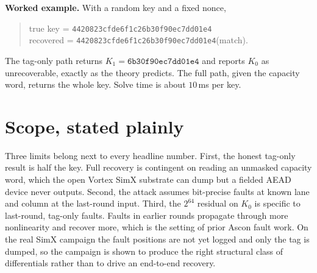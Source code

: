 \documentclass[11pt]{article}
\begin{document}
\noindent\textbf{Worked example.} With a random key and a fixed nonce,
\begin{quote}
true key \;=\; \texttt{4420823cfde6f1c26b30f90ec7dd01e4}\\
recovered \;=\; \texttt{4420823cfde6f1c26b30f90ec7dd01e4}\quad(match).
\end{quote}
The tag-only path returns $K_1 = \texttt{6b30f90ec7dd01e4}$ and reports $K_0$ as
unrecoverable, exactly as the theory predicts. The full path, given the capacity
word, returns the whole key. Solve time is about $10$\,ms per key.

\section{Scope, stated plainly}
Three limits belong next to every headline number.
First, the honest tag-only result is half the key. Full recovery is contingent
on reading an unmasked capacity word, which the open Vortex SimX substrate can
dump but a fielded AEAD device never outputs. Second, the attack assumes
bit-precise faults at known lane and column at the last-round input. Third, the
$2^{64}$ residual on $K_0$ is specific to last-round, tag-only faults. Faults in
earlier rounds propagate through more nonlinearity and recover more, which is
the setting of prior Ascon fault work. On the real SimX campaign the fault
positions are not yet logged and only the tag is dumped, so the campaign is
shown to produce the right structural class of differentials rather than to
drive an end-to-end recovery.
\end{document}
